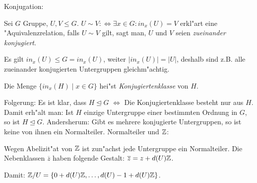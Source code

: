  Konjugation:{
  Sei $G$ Gruppe, $U,V\leq G$. $U\sim V:\iff \exists x\in G:in_x(U)=V$ erkl"art
  eine "Aquivalenzrelation, falls $U\sim V$ gilt, sagt man,
  $U$ und $V$ seien \emph{zueinander konjugiert}.
  
  Es gilt $in_x(U)\leq G=in_x(U)$, weiter $|in_x(U)|=|U|$, deshalb sind z.B.
  alle zueinander konjugierten Untergruppen gleichm"achtig.
  
  Die Menge $\{in_x(H)\mid x\in G\}$ hei"st \emph{Konjugiertenklasse} von $H$.
  }
\remark Folgerung:{
  Es ist klar, dass $H\unlhd G$ $\iff$ Die Konjugiertenklasse besteht nur aus $H$.
  Damit erh"alt man: Ist $H$ einzige Untergruppe einer bestimmten Ordnung
  in $G$, so ist $H\unlhd G$. Andersherum: Gibt es mehrere konjugierte 
  Untergruppen, so ist keine von ihnen ein Normalteiler.
  }
\example Normalteiler und $\mathbb Z$:{
  Wegen Abelizit"at von $\mathbb Z$ ist zun"achst jede Untergruppe
  ein Normalteiler. Die Nebenklassen $\overline z$ haben folgende
  Gestalt: $\overline z=z+d(U)\mathbb Z$. 
  
  Damit: $\mathbb Z/U=\{0+d(U)\mathbb Z,\ldots,d(U)-1+d(U)\mathbb Z\}$.
  }
